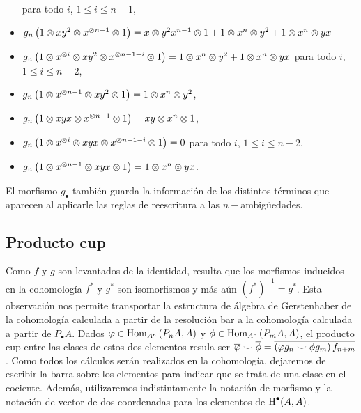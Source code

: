 \documentclass[fleqn,../tesis.tex]{subfiles}
\begin{document}
\begin{prop}
\begin{itemize}
			para todo $i$, $1 \leq i \leq n  - 1$,
		\item $g_n\left(1 \otimes xy^{2} \otimes x^{\otimes n - 1}\otimes 1\right) = x \otimes y^2x^{n - 1} \otimes 1
			+ 1 \otimes x^{n} \otimes y^{2} + 1 \otimes x^{n} \otimes yx$
		\item $g_n\left(1 \otimes x^{\otimes i}\otimes xy^{2} \otimes x^{\otimes n - 1 - i}\otimes 1\right) =
			1 \otimes x^{n} \otimes y^{2} + 1 \otimes x^{n} \otimes yx$ para todo $i$,\\ $1 \leq i \leq n  - 2$,
		\item $g_n\left(1 \otimes x^{\otimes n - 1}\otimes xy^{2} \otimes 1\right) = 1 \otimes x^{n} \otimes y^{2}$,
		\item $g_n\left(1 \otimes xyx \otimes x^{\otimes n - 1}\otimes 1\right) = xy \otimes x^{n} \otimes 1$,
		\item $g_n\left(1 \otimes x^{\otimes i}\otimes xyx \otimes x^{\otimes n - 1 - i}\otimes 1\right) = 0$
			para todo $i$, $1 \leq i \leq n  - 2$,
		\item $g_n\left(1 \otimes x^{\otimes n - 1}\otimes xyx \otimes 1\right) = 1 \otimes x^{n} \otimes yx$.
	\end{itemize}
\end{prop}
El morfismo $g_{\bullet}$ también guarda la información de los distintos términos que aparecen al aplicarle las reglas
de reescritura a las $n-$ambigüedades.

\subsection{Producto cup}
Como $f$ y $g$ son levantados de la identidad, resulta que los morfismos inducidos en la cohomología $f^{\ast}$
y $g^{\ast}$ son isomorfismos y más aún $\left(f^{\ast}\right)^{-1} = g^{\ast}$. Esta observación nos permite 
transportar la estructura de álgebra de Gerstenhaber de la cohomología calculada a partir de la resolución bar
a la cohomología calculada a partir de $P_{\bullet}A$. Dados $\varphi \in \operatorname{Hom}_{A^e}\left(P_n A, A\right)$
y $\phi \in \operatorname{Hom}_{A^e}\left(P_m A, A\right)$, el producto cup entre las clases de estos dos elementos
resula ser $\overline{\varphi} \smile \overline{\phi} = \overline{\left(\varphi g_n \smile \phi g_m\right) f_{n + m}}$.
Como todos los cálculos serán realizados en la cohomología, dejaremos de escribir la barra sobre los elementos
para indicar que se trata de una clase en el cociente. Además, utilizaremos indistintamente la notación de morfismo
y la notación de vector de dos coordenadas para los elementos de $\operatorname{H}^{\bullet}(A, A)$.
\end{document}
